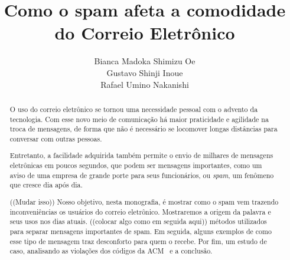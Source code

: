 \documentclass[a4paper,dvipdfm]{article}
\title{Como o spam afeta a comodidade do Correio Eletrônico}
\author{Bianca Madoka Shimizu Oe\\
		Gustavo Shinji Inoue\\
		Rafael Umino Nakanishi}
\begin{document}
\maketitle

\begin{abstract}
	O uso do correio eletrônico se tornou uma necessidade pessoal com o advento da tecnologia. Com esse novo meio de comunicação há maior praticidade e agilidade na troca de mensagens, de forma que não é necessário se locomover longas distâncias para conversar com outras pessoas.

	Entretanto, a facilidade adquirida também permite o envio de milhares de mensagens eletrônicas em poucos segundos, que podem ser mensagens importantes, como um aviso de uma empresa de grande porte para seus funcionários, ou \emph{spam}, um fenômeno que cresce dia após dia.

	((Mudar isso))
	Nosso objetivo, nesta monografia, é mostrar como o spam vem trazendo inconveniências os usuários do correio eletrônico.
	Mostraremos a origem da palavra e seus usos nos dias atuais. 
	((colocar algo como em seguida aqui)) métodos utilizados para separar mensagens importantes de spam.
	Em seguida, alguns exemplos de como esse tipo de mensagem traz desconforto para quem o recebe. 
	Por fim, um estudo de caso, analisando as violações dos códigos da \gls{ACM}~\cite{ACM} e a conclusão.
\end{abstract}

\newpage

\tableofcontents
\newpage
\end{document}

